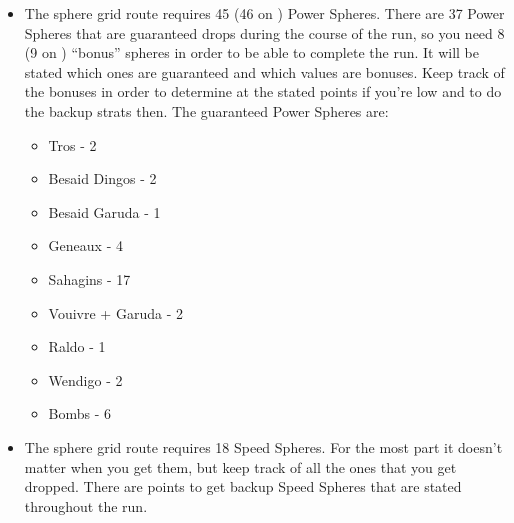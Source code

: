 \begin{itemize}
    \item The sphere grid route requires 45 (46 on \blitzloss) Power Spheres. There are 37 Power Spheres that are guaranteed drops during the course of the run, so you need 8 (9 on \blitzloss) ``bonus'' spheres in order to be able to complete the run. It will be stated which ones are guaranteed and which values are bonuses. Keep track of the bonuses in order to determine at the stated points if you're low and to do the backup strats then. The guaranteed Power Spheres are:
    \begin{itemize}
        \item Tros - 2
        \item Besaid Dingos - 2
        \item Besaid Garuda - 1
        \item Geneaux - 4
        \item Sahagins - 17
        \item Vouivre + Garuda - 2
        \item Raldo - 1
        \item Wendigo - 2
        \item Bombs - 6
    \end{itemize}
    \item The sphere grid route requires 18 Speed Spheres. For the most part it doesn't matter when you get them, but keep track of all the ones that you get dropped. There are points to get backup Speed Spheres that are stated throughout the run.
\end{itemize}

